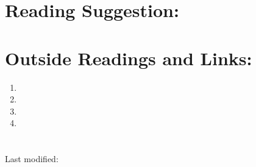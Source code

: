 \documentclass[12pt]{article}
\begin{document}
\section*{Reading Suggestion:}




\hr

\section*{Outside Readings and Links:}
\begin{enumerate}
    \item
    \item
    \item
    \item
\end{enumerate}

\section*{\solutionsname} \loadSolutions

\hr

\mydisclaim \myfooter

Last modified:  \flastmod
\end{document}
